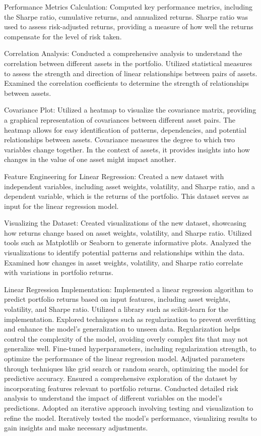 \documentclass[conference]{IEEEtran}
\begin{document}
Performance Metrics Calculation:
Computed key performance metrics, including the Sharpe ratio, cumulative returns, and annualized returns. Sharpe ratio was used to assess risk-adjusted returns, providing a measure of how well the returns compensate for the level of risk taken.

Correlation Analysis:
Conducted a comprehensive analysis to understand the correlation between different assets in the portfolio. Utilized statistical measures to assess the strength and direction of linear relationships between pairs of assets. Examined the correlation coefficients to determine the strength of relationships between assets. 

Covariance Plot:
Utilized a heatmap to visualize the covariance matrix, providing a graphical representation of covariances between different asset pairs. The heatmap allows for easy identification of patterns, dependencies, and potential relationships between assets. Covariance measures the degree to which two variables change together. In the context of assets, it provides insights into how changes in the value of one asset might impact another.

Feature Engineering for Linear Regression:
Created a new dataset with independent variables, including asset weights, volatility, and Sharpe ratio, and a dependent variable, which is the returns of the portfolio. This dataset serves as input for the linear regression model.

Visualizing the Dataset:
Created visualizations of the new dataset, showcasing how returns change based on asset weights, volatility, and Sharpe ratio. Utilized tools such as Matplotlib or Seaborn to generate informative plots. Analyzed the visualizations to identify potential patterns and relationships within the data. Examined how changes in asset weights, volatility, and Sharpe ratio correlate with variations in portfolio returns.

Linear Regression Implementation:
Implemented a linear regression algorithm to predict portfolio returns based on input features, including asset weights, volatility, and Sharpe ratio. Utilized a library such as scikit-learn for the implementation. Explored techniques such as regularization to prevent overfitting and enhance the model's generalization to unseen data. Regularization helps control the complexity of the model, avoiding overly complex fits that may not generalize well. Fine-tuned hyperparameters, including regularization strength, to optimize the performance of the linear regression model. Adjusted parameters through techniques like grid search or random search, optimizing the model for predictive accuracy. Ensured a comprehensive exploration of the dataset by incorporating features relevant to portfolio returns. Conducted detailed risk analysis to understand the impact of different variables on the model's predictions. Adopted an iterative approach involving testing and visualization to refine the model. Iteratively tested the model's performance, visualizing results to gain insights and make necessary adjustments.
\end{document}
